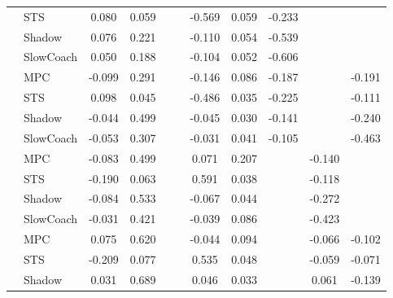 \begin{tabular}{|l|l|*{9}{c|}}
                                                           & STS &    0.080 &     0.059 &        &     & -0.569 &  0.059 &  -0.233 &      &       \\
                                                           & Shadow &    0.076 &     0.221 &        &     & -0.110 &  0.054 &  -0.539 &      &       \\
                                                           & SlowCoach &    0.050 &     0.188 &        &     & -0.104 &  0.052 &  -0.606 &      &       \\
\midrule
[True, True, False, False, True, True, True, False, True] & MPC &   -0.099 &     0.291 &        &     & -0.146 &  0.086 &  -0.187 &      &   -0.191 \\
                                                           & STS &    0.098 &     0.045 &        &     & -0.486 &  0.035 &  -0.225 &      &   -0.111 \\
                                                           & Shadow &   -0.044 &     0.499 &        &     & -0.045 &  0.030 &  -0.141 &      &   -0.240 \\
                                                           & SlowCoach &   -0.053 &     0.307 &        &     & -0.031 &  0.041 &  -0.105 &      &   -0.463 \\
\midrule
[True, True, False, False, True, True, False, True, False] & MPC &   -0.083 &     0.499 &        &     &  0.071 &  0.207 &      &  -0.140 &       \\
                                                           & STS &   -0.190 &     0.063 &        &     &  0.591 &  0.038 &      &  -0.118 &       \\
                                                           & Shadow &   -0.084 &     0.533 &        &     & -0.067 &  0.044 &      &  -0.272 &       \\
                                                           & SlowCoach &   -0.031 &     0.421 &        &     & -0.039 &  0.086 &      &  -0.423 &       \\
\midrule
[True, True, False, False, True, True, False, True, True] & MPC &    0.075 &     0.620 &        &     & -0.044 &  0.094 &      &  -0.066 &   -0.102 \\
                                                           & STS &   -0.209 &     0.077 &        &     &  0.535 &  0.048 &      &  -0.059 &   -0.071 \\
                                                           & Shadow &    0.031 &     0.689 &        &     &  0.046 &  0.033 &      &   0.061 &   -0.139 \\

\end{tabular}
